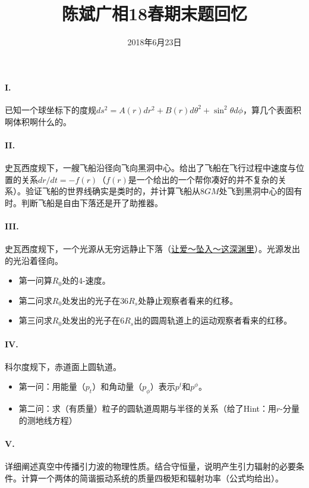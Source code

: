 \documentclass[UTF8]{ctexart}
\title{陈斌广相18春期末题回忆}
\date{2018年6月23日}
\begin{document}
\maketitle
\paragraph{I.}已知一个球坐标下的度规$ds^2=A(r)dr^2+B(r)d\theta^2+\sin^2\theta d\phi$，算几个表面积啊体积啊什么的。

\paragraph{II.}史瓦西度规下，一艘飞船沿径向飞向黑洞中心。给出了飞船在飞行过程中速度与位置的关系$dr/dt=-f(r)$（$f(r)$是一个给出的一个帮你凑好的并不复杂的关系）。验证飞船的世界线确实是类时的，并计算飞船从$8GM$处飞到黑洞中心的固有时。判断飞船是自由下落还是开了助推器。

\paragraph{III.}史瓦西度规下，一个光源从无穷远静止下落（\href{https://www.bilibili.com/video/av6951241}{\twonotes 让爱～坠入～这深渊里\twonotes}）。光源发出的光沿着径向。
\begin{itemize}
  \item 第一问算$R_0$处的4-速度。
  \item 第二问求$R_0$处发出的光子在$36R_s$处静止观察者看来的红移。
  \item 第三问求$R_0$处发出的光子在$6R_s$出的圆周轨道上的运动观察者看来的红移。
\end{itemize}


\paragraph{IV.}科尔度规下，赤道面上圆轨道。
\begin{itemize}
  \item 第一问：用能量（$p_t$）和角动量（$p_{\phi}$）表示$p^t$和$p^{\phi}$。
  \item 第二问：求（有质量）粒子的圆轨道周期与半径的关系（给了Hint：用$r$-分量的测地线方程）
\end{itemize}

\paragraph{V.}详细阐述真空中传播引力波的物理性质。结合守恒量，说明产生引力辐射的必要条件。计算一个两体的简谐振动系统的质量四极矩和辐射功率（公式均给出）。
\end{document}
